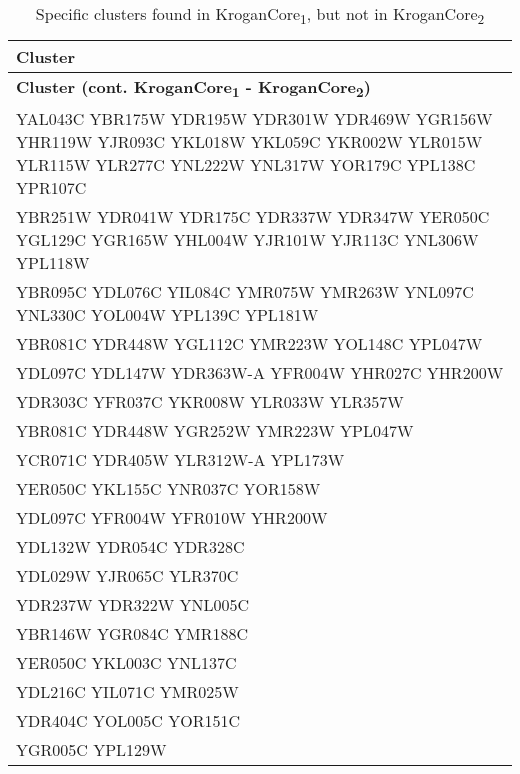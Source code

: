 \setlength{\extrarowheight}{2pt}
\renewcommand{\arraystretch}{1.2}
\begin{longtable}{| m{27em} |}
\caption{Specific clusters found in KroganCore\textsubscript{1}, but not in KroganCore\textsubscript{2}} \\
\hline
\textbf{Cluster} \\
\hline
\endfirsthead
\hline
\textbf{Cluster (cont. KroganCore\textsubscript{1} - KroganCore\textsubscript{2})} \\
\hline
\endhead
\hline
\endfoot
\hline
\endlastfoot
YAL043C YBR175W YDR195W YDR301W YDR469W YGR156W YHR119W YJR093C YKL018W YKL059C YKR002W YLR015W YLR115W YLR277C YNL222W YNL317W YOR179C YPL138C YPR107C \\
\hline
YBR251W YDR041W YDR175C YDR337W YDR347W YER050C YGL129C YGR165W YHL004W YJR101W YJR113C YNL306W YPL118W \\
\hline
YBR095C YDL076C YIL084C YMR075W YMR263W YNL097C YNL330C YOL004W YPL139C YPL181W \\
\hline
YBR081C YDR448W YGL112C YMR223W YOL148C YPL047W \\
\hline
YDL097C YDL147W YDR363W-A YFR004W YHR027C YHR200W \\
\hline
YDR303C YFR037C YKR008W YLR033W YLR357W \\
\hline
YBR081C YDR448W YGR252W YMR223W YPL047W \\
\hline
YCR071C YDR405W YLR312W-A YPL173W \\
\hline
YER050C YKL155C YNR037C YOR158W \\
\hline
YDL097C YFR004W YFR010W YHR200W \\
\hline
YDL132W YDR054C YDR328C \\
\hline
YDL029W YJR065C YLR370C \\
\hline
YDR237W YDR322W YNL005C \\
\hline
YBR146W YGR084C YMR188C \\
\hline
YER050C YKL003C YNL137C \\
\hline
YDL216C YIL071C YMR025W \\
\hline
YDR404C YOL005C YOR151C \\
\hline
YGR005C YPL129W \\
\hline
\end{longtable}